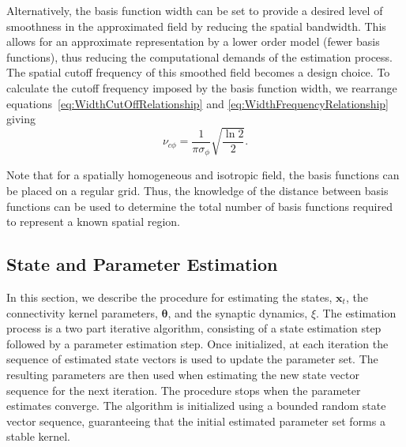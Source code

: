 \documentclass[review,authoryear,3p]{elsarticle}
\begin{document}
Alternatively, the basis function width can be set to provide a desired level of smoothness in the approximated field by reducing the spatial bandwidth. This allows for an approximate representation by a lower order model (fewer basis functions), thus reducing the computational demands of the estimation process. The spatial cutoff frequency of this smoothed field becomes a design choice. To calculate the cutoff frequency imposed by the basis function width, we rearrange equations~\ref{eq:WidthCutOffRelationship} and \ref{eq:WidthFrequencyRelationship} giving
\begin{equation}\label{eq:CutoffFromBasisFuncWidth}
	\nu_{c\phi}=\frac{1}{\pi\sigma_{\phi}}\sqrt{\frac{\ln2}{2}}.
\end{equation} 

Note that for a spatially homogeneous and isotropic field, the basis functions can be placed on a regular grid. Thus, the knowledge of the distance between basis functions can be used to determine the total number of basis functions required to represent a known spatial region.

\subsection{State and Parameter Estimation}\label{StateAndParameterEstimationSection} In this section, we describe the procedure for estimating the states, $\mathbf{x}_t$, the connectivity kernel parameters, $\boldsymbol \theta$, and the synaptic dynamics, $\xi$. The estimation process is a two part iterative algorithm, consisting of a state estimation step followed by a parameter estimation step. Once initialized, at each iteration the sequence of estimated state vectors is used to update the parameter set. The resulting parameters are then used when estimating the new state vector sequence for the next iteration. The procedure stops when the parameter estimates converge. The algorithm is initialized using a bounded random state vector sequence, guaranteeing that the initial estimated parameter set forms a stable kernel.
\end{document}
